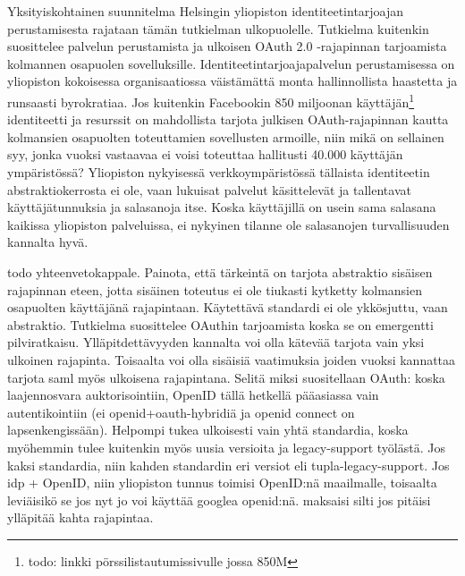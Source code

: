 \documentclass[finnish,gradu]{tktltiki}
\begin{document}
  Yksityiskohtainen suunnitelma Helsingin yliopiston identiteetintarjoajan perustamisesta rajataan tämän tutkielman ulkopuolelle. Tutkielma kuitenkin suosittelee palvelun perustamista ja ulkoisen OAuth 2.0 -rajapinnan tarjoamista kolmannen osapuolen sovelluksille. Identiteetintarjoajapalvelun perustamisessa on yliopiston kokoisessa organisaatiossa väistämättä monta hallinnollista haastetta ja runsaasti byrokratiaa. Jos kuitenkin Facebookin 850 miljoonan käyttäjän\footnote{todo: linkki pörssilistautumissivulle jossa 850M} identiteetti ja resurssit on mahdollista tarjota julkisen OAuth-rajapinnan kautta kolmansien osapuolten toteuttamien sovellusten armoille, niin mikä on sellainen syy, jonka vuoksi vastaavaa ei voisi toteuttaa hallitusti 40.000 käyttäjän ympäristössä? Yliopiston nykyisessä verkkoympäristössä tällaista identiteetin abstraktiokerrosta ei ole, vaan lukuisat palvelut käsittelevät ja tallentavat käyttäjätunnuksia ja salasanoja itse. Koska käyttäjillä on usein sama salasana kaikissa yliopiston palveluissa, ei nykyinen tilanne ole salasanojen turvallisuuden kannalta hyvä.

  todo yhteenvetokappale. Painota, että tärkeintä on tarjota abstraktio sisäisen rajapinnan eteen, jotta sisäinen toteutus ei ole tiukasti kytketty kolmansien osapuolten käyttäjänä rajapintaan. Käytettävä standardi ei ole ykkösjuttu, vaan abstraktio. Tutkielma suosittelee OAuthin tarjoamista koska se on emergentti pilviratkaisu. Ylläpitdettävyyden kannalta voi olla kätevää tarjota vain yksi ulkoinen rajapinta. Toisaalta voi olla sisäisiä vaatimuksia joiden vuoksi kannattaa tarjota saml myös ulkoisena rajapintana.
  Selitä miksi suositellaan OAuth: koska laajennosvara auktorisointiin, OpenID tällä hetkellä pääasiassa vain autentikointiin (ei openid+oauth-hybridiä ja openid connect on lapsenkengissään). Helpompi tukea ulkoisesti vain yhtä standardia, koska myöhemmin tulee kuitenkin myös uusia versioita ja legacy-support työlästä. Jos kaksi standardia, niin kahden standardin eri versiot eli tupla-legacy-support. Jos idp + OpenID, niin yliopiston tunnus toimisi OpenID:nä maailmalle, toisaalta leviäisikö se jos nyt jo voi käyttää googlea openid:nä. maksaisi silti jos pitäisi ylläpitää kahta rajapintaa.

\end{document}
